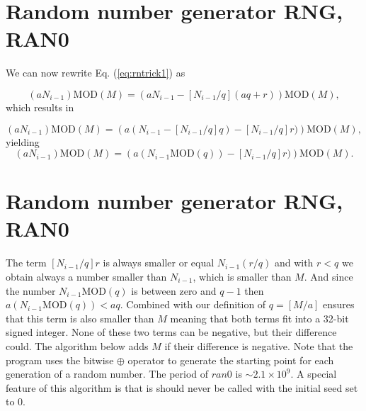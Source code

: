 \documentclass[%
oneside,                 %
final,                   %
10pt]{article}
\newenvironment{block_mdfboxadmon}[1][]{
\begin{block_mdfboxmdframed}[frametitle=#1]
}
{
\end{block_mdfboxmdframed}
}
\begin{document}
\section{Random number generator RNG, RAN0}

\begin{block_mdfboxadmon}[]
We can now rewrite Eq. (\ref{eq:rntrick1}) as

\begin{equation}
(aN_{i-1}) \mathrm{MOD} (M)= (aN_{i-1}-[N_{i-1}/q](aq+r))\mathrm{MOD} (M),
\label{eq:rntrick2}
\end{equation}
which results
in

\begin{equation}
(aN_{i-1}) \mathrm{MOD} (M)= \left(a(N_{i-1}-[N_{i-1}/q]q)-[N_{i-1}/q]r)\right)\mathrm{MOD} (M),
\label{eq:rntrick3}
\end{equation}
yielding
\begin{equation}
(aN_{i-1}) \mathrm{MOD} (M)= \left(a(N_{i-1}\mathrm{MOD} (q)) -[N_{i-1}/q]r)\right)\mathrm{MOD} (M).
\label{eq:rntrick4}
\end{equation}
\end{block_mdfboxadmon} %




\section{Random number generator RNG, RAN0}

\begin{block_mdfboxadmon}[]
The term $[N_{i-1}/q]r$ is always smaller or equal $N_{i-1}(r/q)$ and with $r < q$ we obtain always a 
number smaller than $N_{i-1}$, which is smaller than $M$. 
And since the number $N_{i-1}\mathrm{MOD} (q)$ is between zero and $q-1$ then
$a(N_{i-1}\mathrm{MOD} (q))< aq$. Combined with our definition of $q=[M/a]$ ensures that 
this term is also smaller than $M$ meaning that both terms fit into a
32-bit signed integer. None of these two terms can be negative, but their difference could.
The algorithm below adds $M$ if their difference is negative.
Note that the program uses the bitwise $\oplus$ operator to generate
the starting point for each generation of a random number. The period
of $ran0$ is $\sim 2.1\times 10^{9}$. A special feature of this
algorithm is that is should never be called with the initial seed 
set to $0$.
\end{block_mdfboxadmon} %
\end{document}
